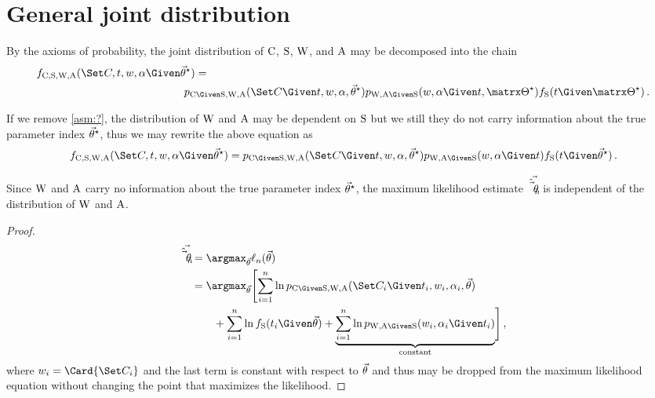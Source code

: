 \documentclass[../main.tex]{subfiles}
\begin{document}
\chapter{General joint distribution}
\label{appendix:generalized_general_joint_likelihood_cand}
By the axioms of probability, the joint distribution of $\mathrm{C}$, $\mathrm{S}$, $\mathrm{W}$, and $\mathrm{A}$ may be decomposed into the chain
\begin{equation}
\begin{split}
\pdf_{\rvcand, \sv, \RV{W}, \RV{A}}(\cand, t, w, \alpha \Given \tparam\sysparamvec) &=\\ &\!\!\!\!\!\!\pmf_{\rvcand \Given \sv, \RV{W}, \RV{A}}(\cand \Given t, w, \alpha, \tparam\sysparamvec) \pmf_{\RV{W}, \RV{A} \Given \sv}(w, \alpha \Given t, \tparam\sysparam) \spdf(t \Given \tparam\sysparam)\,.
\end{split}
\end{equation}

If we remove \cref{asm:?}, the distribution of $\mathrm{W}$ and $\mathrm{A}$ may be dependent on $\mathrm{S}$ but we still they do not carry information about the true parameter index ${\vec{\theta}}^{\star}$, thus we may rewrite the above equation as
\begin{equation}
\pdf_{\rvcand, \sv, \RV{W}, \RV{A}}(\cand, t, w, \alpha \Given \tparam\sysparamvec) = \pmf_{\rvcand \Given \sv, \RV{W}, \RV{A}}(\cand \Given t, w, \alpha, \tparam\sysparamvec) \pmf_{\RV{W}, \RV{A} \Given \sv}(w, \alpha \Given t) \spdf(t \Given \tparam\sysparamvec)\,.
\end{equation}

Since $\mathrm{W}$ and $\mathrm{A}$ carry no information about the true parameter index ${\vec{\theta}}^{\star}$, the maximum likelihood estimate $\vec{\hat{\vec{\theta}}_{n}}$ is independent of the distribution of $\mathrm{W}$ and $\mathrm{A}$.
\begin{proof}
\begin{equation}
\begin{split}
    \mleu &= \argmax_{\sysparamvec}
        \ell_n(\sysparamvec)\\
        &= \argmax_{\sysparamvec} \Biggl[ \sum_{i=1}^{n}
        \ln \pmf_{\rvcand \Given \sv, \RV{W}, \RV{A}}(\cand_i \Given t_i, w_i, \alpha_i, \sysparamvec)\\
        &\qquad+ \sum_{i=1}^{n} \ln \spdf(t_i \Given \sysparamvec) + \underbrace{\sum_{i=1}^{n} \ln \pmf_{\RV{W}, \RV{A} \Given \sv}(w_i, \alpha_i \Given t_i)}_{\text{constant}}\Biggr]\,,
\end{split}
\end{equation}
where $w_i = \Card{\cand_i}$ and the last term is constant with respect to $\vec{\theta}$ and thus may be dropped from the maximum likelihood equation without changing the point that maximizes the likelihood.
\end{proof}
\end{document}

